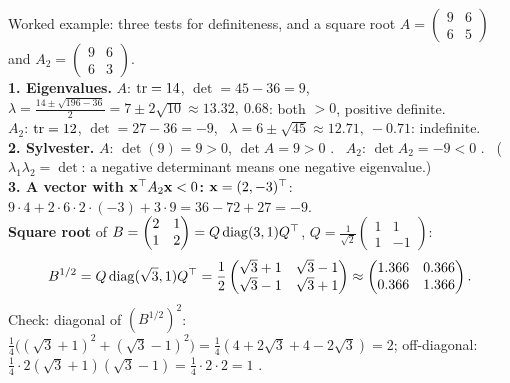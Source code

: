 \documentclass[aspectratio=1610,11pt]{beamer}
\begin{document}
\begin{frame}{Worked example: three tests for definiteness, and a square root}
    \small
    $A = \begin{pmatrix} 9 & 6 \\ 6 & 5 \end{pmatrix}$ and $A_2 = \begin{pmatrix} 9 & 6 \\ 6 & 3 \end{pmatrix}$.
    \\[0.3em]
    \textbf{1. Eigenvalues.} $A$: $\operatorname{tr} = 14$, $\det = 45 - 36 = 9$, \ $\lambda = \frac{14 \pm \sqrt{196 - 36}}{2} = 7 \pm 2\sqrt{10} \approx 13.32,\ 0.68$: both $> 0$, positive definite. \\
    $A_2$: $\operatorname{tr} = 12$, $\det = 27 - 36 = -9$, \ $\lambda = 6 \pm \sqrt{45} \approx 12.71,\ -0.71$: indefinite.
    \\[0.3em]
    \textbf{2. Sylvester.} $A$: $\det(9) = 9 > 0$, $\det A = 9 > 0$ \checkmark. \ $A_2$: $\det A_2 = -9 < 0$ \texttimes. \ ($\lambda_1\lambda_2 = \det$: a negative determinant means one negative eigenvalue.)
    \\[0.3em]
    \textbf{3. A vector with $\mathbf{x}^\top A_2\mathbf{x} < 0$:} $\mathbf{x} = (2, -3)^\top$: $9 \cdot 4 + 2 \cdot 6 \cdot 2 \cdot (-3) + 3 \cdot 9 = 36 - 72 + 27 = -9$.
    \\[0.4em]
    \textbf{Square root} of $B = \begin{pmatrix} 2 & 1 \\ 1 & 2 \end{pmatrix} = Q\operatorname{diag}(3, 1)Q^\top$, $Q = \frac{1}{\sqrt2}\begin{pmatrix} 1 & 1 \\ 1 & -1 \end{pmatrix}$:
    \[B^{1/2} = Q\operatorname{diag}(\sqrt3, 1)Q^\top = \frac{1}{2}\begin{pmatrix} \sqrt3 + 1 & \sqrt3 - 1 \\ \sqrt3 - 1 & \sqrt3 + 1 \end{pmatrix} \approx \begin{pmatrix} 1.366 & 0.366 \\ 0.366 & 1.366 \end{pmatrix}.\]
    Check: diagonal of $(B^{1/2})^2$: $\frac{1}{4}\big((\sqrt3 + 1)^2 + (\sqrt3 - 1)^2\big) = \frac{1}{4}(4 + 2\sqrt3 + 4 - 2\sqrt3) = 2$; off-diagonal: $\frac{1}{4} \cdot 2(\sqrt3 + 1)(\sqrt3 - 1) = \frac{1}{4} \cdot 2 \cdot 2 = 1$ \checkmark.
\end{frame}

\end{document}
